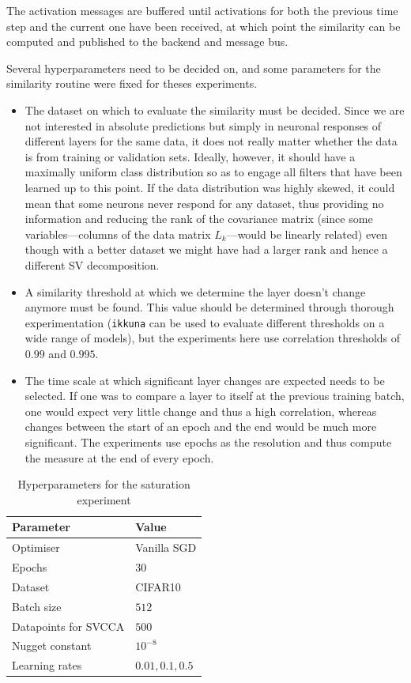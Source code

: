 The activation messages are buffered until activations for both the previous
time step and the current one have been received, at which point the similarity
can be computed and published to the backend and message bus.

Several hyperparameters need to be decided on, and some parameters for the
similarity routine were fixed for theses experiments.
\begin{itemize}
    \item The dataset on
        which to evaluate the similarity must be decided. Since we are not interested in
        absolute predictions but simply in neuronal responses of different layers for
        the same data, it does not really matter whether the data is from training or
        validation sets. Ideally, however, it should have a maximally uniform class
        distribution so as to engage all filters that have been learned up to this
        point. If the data distribution was highly skewed, it could mean that some
        neurons never respond for any dataset, thus providing no information and
        reducing the rank of the covariance matrix (since some variables---columns of
        the data matrix $L_k$---would be linearly related) even though with a better
        dataset we might have had a larger rank and hence a different SV decomposition.
    \item A similarity threshold at which we determine the layer doesn't change
        anymore must be found. This value should be determined through thorough
        experimentation (\texttt{ikkuna} can be used to evaluate different
        thresholds on a wide range of models), but the experiments here use
        correlation thresholds of $0.99$ and $0.995$.
    \item The time scale at which significant layer changes are expected needs
        to be selected. If one was to compare a layer to itself at the previous
        training batch, one would expect very little change and thus a high
        correlation, whereas changes between the start of an epoch and the end
        would be much more significant. The experiments use epochs as the
        resolution and thus compute the measure at the end of every epoch.
\end{itemize}
\begin{table}
    \centering
    \caption{Hyperparameters for the saturation experiment}
    \label{tbl:params-saturation}
    \begin{tabular}{ll}
        Parameter            & Value \\\hline\hline
        Optimiser            & Vanilla SGD \\\hline
        Epochs               & $30$ \\\hline
        Dataset              & CIFAR10 \\\hline
        Batch size           & $512$ \\\hline
        Datapoints for SVCCA & $500$ \\\hline
        Nugget constant      & $10^{-8}$ \\\hline
        Learning rates       & $0.01, 0.1, 0.5$
    \end{tabular}
\end{table}

